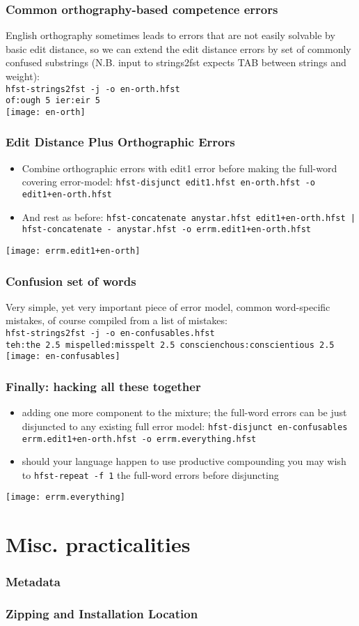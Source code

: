 \documentclass[t,12pt,pdftex]{beamer}
\begin{document}
\begin{frame}
    \frametitle{Common orthography-based competence errors}
    English orthography sometimes leads to errors that are not
    easily solvable by basic edit distance, so we can extend the
    edit distance errors by set of commonly confused substrings (N.B.
    input to strings2fst expects TAB between strings and weight):\\
    \texttt{hfst-strings2fst -j -o en-orth.hfst\\
    of:ough	5
    ier:eir	5}
    \\
    \texttt{[image: en-orth]}
\end{frame}

\begin{frame}
    \frametitle{Edit Distance Plus Orthographic Errors}
    \begin{itemize}
        \item Combine orthographic errors with edit1 error before making the
            full-word covering error-model:
            \texttt{hfst-disjunct edit1.hfst en-orth.hfst -o edit1+en-orth.hfst}
        \item And rest as before: 
            \texttt{hfst-concatenate anystar.hfst edit1+en-orth.hfst | 
            hfst-concatenate - anystar.hfst -o errm.edit1+en-orth.hfst}
    \end{itemize}
    \texttt{[image: errm.edit1+en-orth]}
\end{frame}

\begin{frame}
    \frametitle{Confusion set of words}
    Very simple, yet very important piece of error model, common word-specific
    mistakes, of course compiled from a list of mistakes:\\
    \texttt{hfst-strings2fst -j -o en-confusables.hfst\\
    teh:the	2.5
    mispelled:misspelt	2.5
    conscienchous:conscientious	2.5}
    \texttt{[image: en-confusables]}
\end{frame}

\begin{frame}
    \frametitle{Finally: hacking all these together}
    \begin{itemize}
        \item adding one more component to the mixture; the full-word errors
            can be just disjuncted to any existing full error model:
            \texttt{hfst-disjunct en-confusables errm.edit1+en-orth.hfst
            -o errm.everything.hfst}
        \item should your language happen to use productive compounding you may
            wish to \texttt{hfst-repeat -f 1} the full-word errors before
            disjuncting
    \end{itemize}
    \texttt{[image: errm.everything]}
\end{frame}

\section{Misc. practicalities}

\begin{frame}
    \frametitle{Metadata}

\end{frame}

\begin{frame}
    \frametitle{Zipping and Installation Location}

\end{frame}
\end{document}
